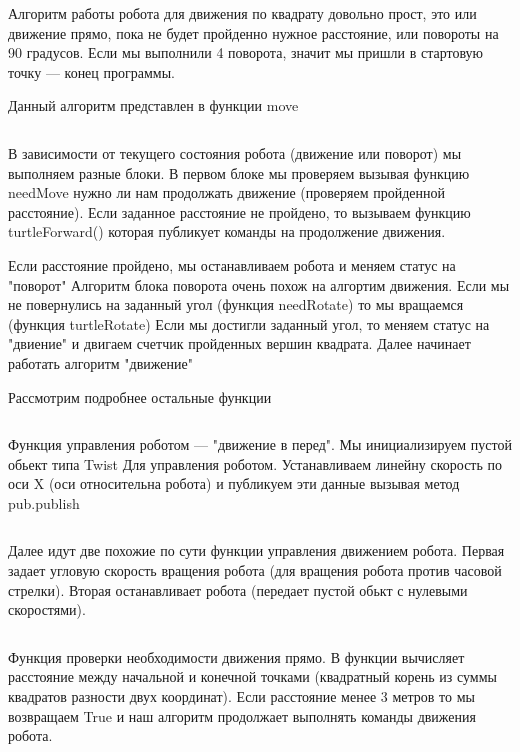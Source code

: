 Алгоритм работы робота для движения по квадрату довольно прост, это или движение прямо, пока не будет пройденно нужное расстояние, или повороты на 90 градусов. Если мы выполнили 4 поворота, значит мы пришли в стартовую точку — конец программы.

Данный алгоритм представлен в функции move

\inputminted[fontsize=\footnotesize, linenos]{python}{2nd_tour/aero_sys/task_01/source_1.py}

В зависимости от текущего состояния робота (движение или поворот) мы выполняем разные блоки. В первом блоке мы проверяем вызывая функцию needMove нужно ли нам продолжать движение (проверяем пройденной расстояние). Если заданное расстояние не пройдено, то вызываем функцию turtleForward() которая публикует команды на продолжение движения.

Если расстояние пройдено, мы останавливаем робота и меняем статус на "поворот"
Алгоритм блока поворота очень похож на алгортим движения. Если мы не повернулись на заданный угол (функция needRotate) то мы вращаемся (функция turtleRotate) Если мы достигли заданный угол, то меняем статус на "двиение" и двигаем счетчик пройденных вершин квадрата. Далее начинает работать алгоритм "движение"

Рассмотрим подробнее остальные функции

\inputminted[fontsize=\footnotesize, linenos]{python}{2nd_tour/aero_sys/task_01/source_2.py}

Функция управления роботом — "движение в перед". Мы инициализируем пустой обьект типа Twist Для управления роботом. Устанавливаем линейну скорость по оси X (оси относительна робота) и публикуем эти данные вызывая метод pub.publish

\inputminted[fontsize=\footnotesize, linenos]{python}{2nd_tour/aero_sys/task_01/source_3.py}

Далее идут две похожие по сути функции управления движением робота. Первая задает угловую скорость вращения робота (для вращения робота против часовой стрелки). Вторая останавливает робота (передает пустой обькт с нулевыми скоростями).

\inputminted[fontsize=\footnotesize, linenos]{python}{2nd_tour/aero_sys/task_01/source_4.py}

Функция проверки необходимости движения прямо. В функции вычисляет расстояние между начальной и конечной точками (квадратный корень из суммы квадратов разности двух координат). Если расстояние менее 3 метров то мы возвращаем True и наш алгоритм продолжает выполнять команды движения робота.

